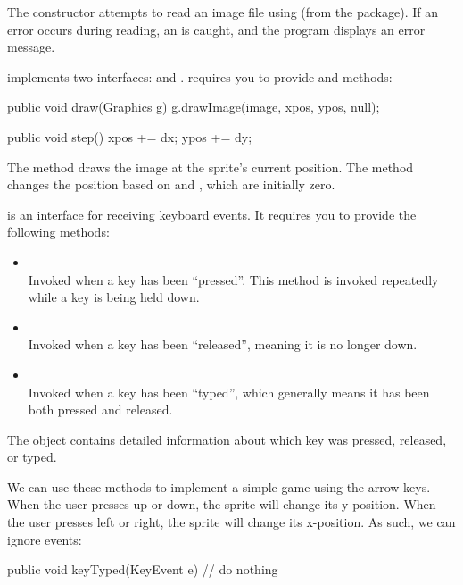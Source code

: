 The constructor attempts to read an image file using  (from the  package).
If an error occurs during reading, an  is caught, and the program displays an error message.

 implements two interfaces:  and .
 requires you to provide  and  methods:

\begin{code}
public void draw(Graphics g) {
    g.drawImage(image, xpos, ypos, null);
}

public void step() {
    xpos += dx;
    ypos += dy;
}
\end{code}

The  method draws the image at the sprite's current position.
The  method changes the position based on  and , which are initially zero.

 is an interface for receiving keyboard events.
It requires you to provide the following methods:

\begin{itemize}
\item {}
\\ Invoked when a key has been ``pressed''.
This method is invoked repeatedly while a key is being held down.

\item {}
\\ Invoked when a key has been ``released'', meaning it is no longer down.

\item {}
\\ Invoked when a key has been ``typed'', which generally means it has been both pressed and released.
\end{itemize}

The  object contains detailed information about which key was pressed, released, or typed.

We can use these methods to implement a simple game using the arrow keys.
When the user presses up or down, the sprite will change its y-position.
When the user presses left or right, the sprite will change its x-position.
As such, we can ignore  events:

\begin{code}
public void keyTyped(KeyEvent e) {
    // do nothing
}
\end{code}

